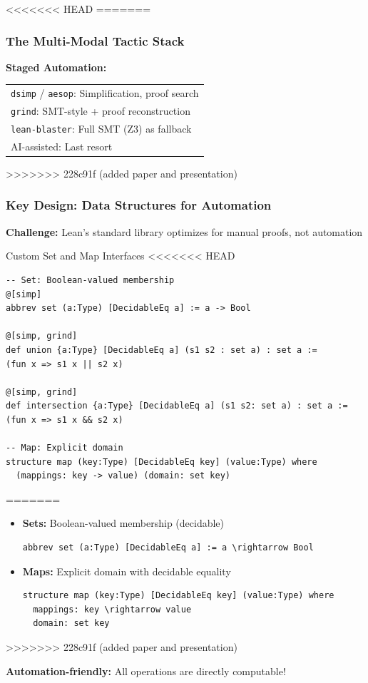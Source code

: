 \documentclass[usepdftitle=false]{beamer}
\begin{document}
<<<<<<< HEAD
=======
\begin{frame}
  \frametitle{The Multi-Modal Tactic Stack}
  
  \centering
  \vspace{0.5cm}
  \textbf{Staged Automation:} \\[0.3cm]
  \begin{tabular}{|l|}
    \hline
    \texttt{dsimp} / \texttt{aesop}: Simplification, proof search \\
    \texttt{grind}: SMT-style + proof reconstruction \\
    \texttt{lean-blaster}: Full SMT (Z3) as fallback \\
    AI-assisted: Last resort \\
    \hline
  \end{tabular}
\end{frame}
>>>>>>> 228c91f (added paper and presentation)

\begin{frame}[fragile]
  \frametitle{Key Design: Data Structures for Automation}
  
  \textbf{Challenge:} Lean's standard library optimizes for manual proofs, not automation
  
  \vspace{0.3cm}
  \begin{block}{Custom Set and Map Interfaces}
<<<<<<< HEAD
    \small
    \begin{lstlisting}[style=leanstyle,basicstyle=\tiny\ttfamily]
-- Set: Boolean-valued membership
@[simp]
abbrev set (a:Type) [DecidableEq a] := a -> Bool

@[simp, grind]
def union {a:Type} [DecidableEq a] (s1 s2 : set a) : set a :=
(fun x => s1 x || s2 x)

@[simp, grind]
def intersection {a:Type} [DecidableEq a] (s1 s2: set a) : set a :=
(fun x => s1 x && s2 x)

-- Map: Explicit domain
structure map (key:Type) [DecidableEq key] (value:Type) where
  (mappings: key -> value) (domain: set key)
    \end{lstlisting}
=======
    \begin{itemize}
      \item \textbf{Sets:} Boolean-valued membership (decidable)
        \begin{lstlisting}[style=leanstyle]
abbrev set (a:Type) [DecidableEq a] := a \rightarrow Bool
        \end{lstlisting}
      
      \item \textbf{Maps:} Explicit domain with decidable equality
        \begin{lstlisting}[style=leanstyle]
structure map (key:Type) [DecidableEq key] (value:Type) where
  mappings: key \rightarrow value
  domain: set key
        \end{lstlisting}
    \end{itemize}
>>>>>>> 228c91f (added paper and presentation)
  \end{block}
  
  \vspace{0.2cm}
  \textbf{Automation-friendly:} All operations are directly computable!
\end{frame}
\end{document}
